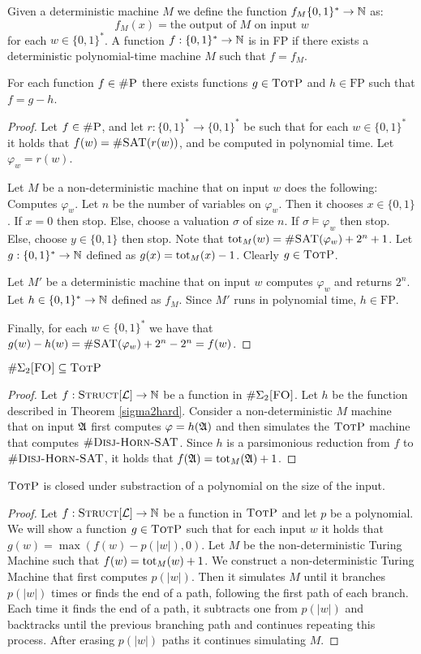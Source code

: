Given a deterministic machine $M$ we define the function $f_M\{0,1\}^*\to\mathbb{N}$ as:
\[
	f_M(x) = \text{the output of $M$ on input $w$}
\]
for each $w\in\{0,1\}^*$. A function $f:\{0,1\}^*\to\mathbb{N}$ is in FP if there exists a deterministic polynomial-time machine $M$ such that $f = f_M$.
\begin{theo} \label{diff}
	For each function $f\in\textsc{\#P}$ there exists functions $g\in \textsc{TotP}$ and $h\in\text{FP}$ such that $f = g - h$.
\end{theo}
\begin{proof}
	Let $f\in\textsc{\#P}$, and let $r:\{0,1\}^*\to\{0,1\}^*$ be such that for each $w\in\{0,1\}^*$ it holds that $f(w) = \textsc{\#SAT}(r(w))$, and be computed in polynomial time. Let $\varphi_w = r(w)$.
	
	Let $M$ be a non-deterministic machine that on input $w$ does the following: Computes $\varphi_w$. Let $n$ be the number of variables on $\varphi_w$. Then it chooses $x\in\{0,1\}$. If $x = 0$ then stop. Else, choose a valuation $\sigma$ of size $n$. If $\sigma\models\varphi_w$ then stop. Else, choose $y\in\{0,1\}$ then stop. Note that $\text{tot}_M(w) = \textsc{\#SAT}(\varphi_w)+2^n+1$. Let $g:\{0,1\}^*\to\mathbb{N}$ defined as $g(x) = \text{tot}_M(x) - 1$. Clearly $g\in\textsc{TotP}$.
	
	Let $M'$ be a deterministic machine that on input $w$ computes $\varphi_w$ and returns $2^n$. Let $h\in\{0,1\}^*\to\mathbb{N}$ defined as $f_M$. Since $M'$ runs in polynomial time, $h\in\text{FP}$.
	
	Finally, for each $w\in\{0,1\}^*$ we have that $g(w) - h(w) = \textsc{\#SAT}(\varphi_w) + 2^n - 2^n = f(w)$.
\end{proof}

\begin{theo}
	$\#\Sigma_{2}\textsc{[FO]} \subseteq \textsc{TotP}$
\end{theo}
\begin{proof}
	Let $f:\textsc{Struct}[{\cal L}]\to\mathbb{N}$ be a function in $\#\Sigma_{2}\textsc{[FO]}$. Let $h$ be the function described in Theorem \ref{sigma2hard}. Consider a non-deterministic $M$ machine that on input ${\frak A}$ first computes $\varphi = h({\frak A})$ and then simulates the $\textsc{TotP}$ machine that computes $\textsc{\#Disj-Horn-SAT}$. Since $h$ is a parsimonious reduction from $f$ to $\textsc{\#Disj-Horn-SAT}$, it holds that $f({\frak A}) = \text{tot}_M({\frak A})+1$.
\end{proof}

\begin{theo}
	$\textsc{TotP}$ is closed under substraction of a polynomial on the size of the input.
\end{theo}
\begin{proof}
	Let $f:\textsc{Struct}[{\cal L}]\to\mathbb{N}$ be a function in $\textsc{TotP}$ and let $p$ be a polynomial. We will show a function $g\in\textsc{TotP}$ such that for each input $w$ it holds that $g(w) = \max(f(w) - p(\vert w \vert),0)$. Let $M$ be the non-deterministic Turing Machine such that $f(w) = \text{tot}_M(w)+1$. We construct a non-deterministic Turing Machine that first computes $p(\vert w \vert)$. Then it simulates $M$ until it branches $p(\vert w \vert)$ times or finds the end of a path, following the first path of each branch. Each time it finds the end of a path, it subtracts one from $p(\vert w \vert)$ and backtracks until the previous branching path and continues repeating this process. After erasing $p(\vert w \vert)$ paths it continues simulating $M$. 	
\end{proof}